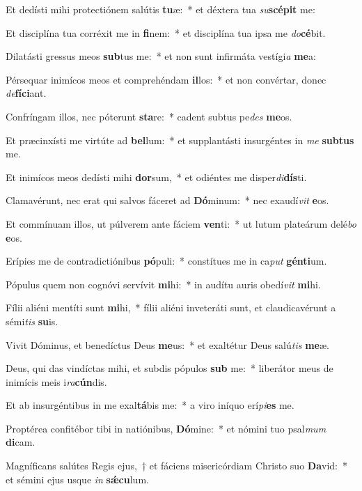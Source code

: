 \item Et dedísti mihi protectiónem salútis \textbf{tu}æ:~* et déxtera tua \textit{su}\textbf{scé}\textbf{pit} me:
\item Et disciplína tua corréxit me in \textbf{fi}nem:~* et disciplína tua ipsa me \textit{do}\textbf{cé}bit.
\item Dilatásti gressus meos \textbf{sub}tus me:~* et non sunt infirmáta vestígi\textit{a} \textbf{me}a:
\item Pérsequar inimícos meos et comprehéndam \textbf{il}los:~* et non convértar, donec \textit{de}\textbf{fí}\textbf{ci}ant.
\item Confríngam illos, nec póterunt \textbf{sta}re:~* cadent subtus pe\textit{des} \textbf{me}os.
\item Et præcinxísti me virtúte ad \textbf{bel}lum:~* et supplantásti insurgéntes in \textit{me} \textbf{sub}\textbf{tus} me.
\item Et inimícos meos dedísti mihi \textbf{dor}sum,~* et odiéntes me disper\textit{di}\textbf{dís}ti.
\item Clamavérunt, nec erat qui salvos fáceret ad \textbf{Dó}minum:~* nec exaudí\textit{vit} \textbf{e}os.
\item Et commínuam illos, ut púlverem ante fáciem \textbf{ven}ti:~* ut lutum plateárum delé\textit{bo} \textbf{e}os.
\item Erípies me de contradictiónibus \textbf{pó}puli:~* constítues me in ca\textit{put} \textbf{gén}\textbf{ti}um.
\item Pópulus quem non cognóvi servívit \textbf{mi}hi:~* in audítu auris obedí\textit{vit} \textbf{mi}hi.
\item Fílii aliéni mentíti sunt \textbf{mi}hi,~* fílii aliéni inveteráti sunt, et claudicavérunt a sémi\textit{tis} \textbf{su}is.
\item Vivit Dóminus, et benedíctus Deus \textbf{me}us:~* et exaltétur Deus salú\textit{tis} \textbf{me}æ.
\item Deus, qui das vindíctas mihi, et subdis pópulos \textbf{sub} me:~* liberátor meus de inimícis meis i\textit{ra}\textbf{cún}dis.
\item Et ab insurgéntibus in me exal\textbf{tá}bis me:~* a viro iníquo erí\textit{pi}\textbf{es} me.
\item Proptérea confitébor tibi in natiónibus, \textbf{Dó}mine:~* et nómini tuo psal\textit{mum} \textbf{di}cam.
\item Magníficans salútes Regis ejus,~† et fáciens misericórdiam Christo suo \textbf{Da}vid:~* et sémini ejus usque \textit{in} \textbf{sǽ}\textbf{cu}lum.
